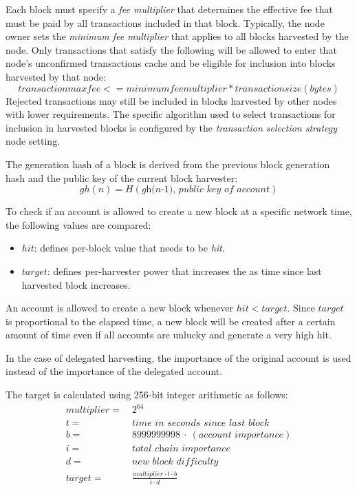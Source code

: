 
Each block must specify a \textit{fee multiplier} that determines the effective fee that must be paid by all transactions included in that block.
Typically, the node owner sets the \textit{minimum fee multiplier} that applies to all blocks harvested by the node.
Only transactions that satisfy the following will be allowed to enter that node's unconfirmed transactions cache and be eligible for inclusion into blocks harvested by that node:
$$transaction max fee <= minimum fee multiplier * transaction size (bytes)$$
Rejected transactions may still be included in blocks harvested by other nodes with lower requirements.
The specific algorithm used to select transactions for inclusion in harvested blocks is configured by the \textit{transaction selection strategy} node setting.


The generation hash of a block is derived from the previous block generation hash and the public key of the current block harvester:
\begin{equation}
\tag{generation hash} \mathit{gh(n)} = H(\textit{gh(n-1), public key of account})
\end{equation}

To check if an account is allowed to create a new block at a specific network time, the following values are compared:
\begin{itemize}
\item{ $hit$: defines per-block value that needs to be \textit{hit}.}
\item{ $target$: defines per-harvester power that increases the as time since last harvested block increases.}
\end{itemize}
An account is allowed to create a new block whenever $\mathit{hit} < \mathit{target}$.
Since $\mathit{target}$ is proportional to the elapsed time, a new block will be created after a certain amount of time even if all accounts are unlucky and generate a very high hit.

In the case of delegated harvesting, the importance of the original account is used instead of the importance of the delegated account.

The target is calculated using 256-bit integer arithmetic as follows:
\begin{align*}
multiplier = \: & 2^{64} \\
t = \: & \textit{time in seconds since last block} \\
b = \: & 8999999998 \: \cdot \: (\textit{account importance}) \\
i = \: & \textit{total chain importance} \\
d = \: & \textit{new block difficulty} \\
target = \: & \frac{multiplier \cdot t \cdot b}{i \cdot d}
\end{align*}


